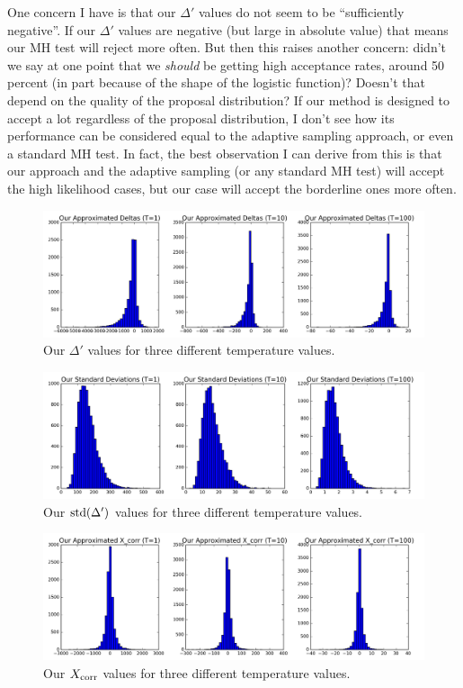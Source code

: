 \documentclass{article}
\begin{document}
{\color{blue}
One concern I have is that our $\Delta'$ values do not seem to be ``sufficiently negative''. If our
$\Delta'$ values are negative (but large in absolute value) that means our MH test will reject more
often. But then this raises another concern: didn't we say at one point that we \emph{should} be
getting high acceptance rates, around 50 percent (in part because of the shape of the logistic
function)? Doesn't that depend on the quality of the proposal distribution? If our method is
designed to accept a lot regardless of the proposal distribution, I don't see how its performance
can be considered equal to the adaptive sampling approach, or even a standard MH test. In fact, the
best observation I can derive from this is that our approach and the adaptive sampling (or any
standard MH test) will accept the high likelihood cases, but our case will accept the borderline
ones more often.
}

\begin{figure}[ht]
  \centering
  \includegraphics[width=1\linewidth]{our_deltas_v01.png}
  \caption{Our $\Delta'$ values for three different temperature values.}
  \label{fig:diagnostics1}
\end{figure}

\begin{figure}[ht]
  \centering
  \includegraphics[width=1\linewidth]{our_sds_v01.png}
  \caption{Our ${\rm std}(\Delta')$ values for three different temperature values.}
  \label{fig:diagnostics2}
\end{figure}

\begin{figure}[ht]
  \centering
  \includegraphics[width=1\linewidth]{our_xcorrs_v01.png}
  \caption{Our $X_{\rm corr}$ values for three different temperature values.}
  \label{fig:diagnostics3}
\end{figure}
\end{document}
